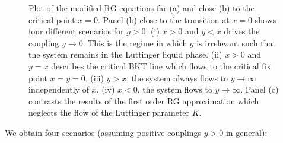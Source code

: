 \begin{figure}
    \caption{Plot of the modified RG equations far (a) and close (b) to the critical point $x=0$. Panel (b) close to the transition at $x=0$ shows four different scenarios for $g>0$: (i) $x>0$ and $y<x$ drives the coupling $y\rightarrow0$. This is the regime in which $g$ is irrelevant such that the system remains in the Luttinger liquid phase. (ii) $x>0$ and $y=x$ describes the critical BKT line which flows to the critical fix point $x=y=0$. (iii) $y>x$, the system always flows to $y\rightarrow\infty$ independently of $x$. (iv) $x<0$, the system flows to $y\rightarrow\infty$. Panel (c) contrasts the results of the first order RG approximation which neglects the flow of the Luttinger parameter $K$.}
    \label{fig:bkt_flow_equations}
\end{figure}

We obtain four scenarios (assuming positive couplings $y>0$ in general):

